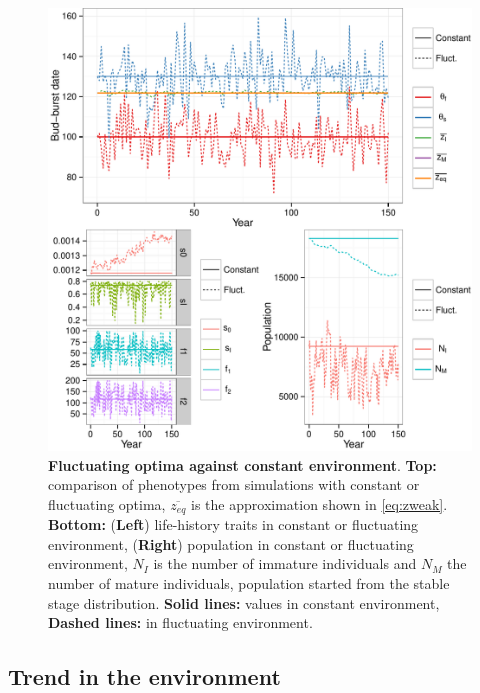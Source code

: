 \begin{figure}[ht!]
	\centering
	\includegraphics[scale=1]{Figures/PhenoLHTwithCorr.pdf}
	\caption{\textbf{Fluctuating optima against constant environment}. \textbf{Top:} comparison of phenotypes from simulations with constant or fluctuating optima, $\overline{z_{eq}}$ is the approximation shown in \autoref{eq:zweak}. \textbf{Bottom:} (\textbf{Left}) life-history traits in constant or fluctuating environment, (\textbf{Right}) population in constant or fluctuating environment, $N_I$ is the number of immature individuals and $N_M$ the number of mature individuals, population started from the stable stage distribution. \textbf{Solid lines:} values in constant environment, \textbf{Dashed lines:} in fluctuating environment.}
	\label{fig:corr}
\end{figure}

\subsection*{Trend in the environment}

